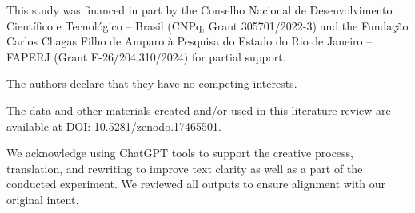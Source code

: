 \begin{declarations}

\begin{funding}
This study was financed in part by the Conselho Nacional de Desenvolvimento Científico e Tecnológico – Brasil (CNPq, Grant 305701/2022-3) and the Fundação Carlos Chagas Filho de Amparo à Pesquisa do Estado do Rio de Janeiro – FAPERJ (Grant E-26/204.310/2024) for partial support.
\end{funding}


\begin{interests}
The authors declare that they have no competing interests.
\end{interests}

\begin{materials}
The data and other materials created and/or used in this literature review
are available at DOI: 10.5281/zenodo.17465501.
\end{materials}

\begin{aitools}
We acknowledge using ChatGPT tools to support the creative process,
translation, and rewriting to improve text clarity as well as a part of the conducted experiment. We reviewed all outputs to ensure alignment with our original intent.
\end{aitools}

\end{declarations}